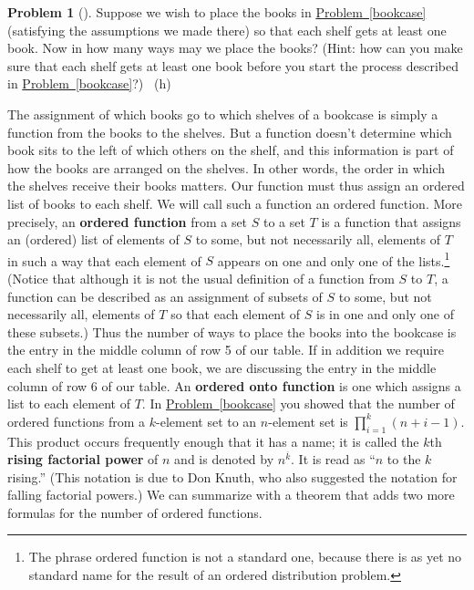 \documentclass[10pt,]{book}
\newcommand{\terminology}[1]{\textbf{#1}}
\theoremstyle{plain}
\theoremstyle{definition}
\newtheorem{activity}[project]{Problem}
\theoremstyle{definition}
\numberwithin{equation}{chapter}
\begin{document}
\begin{activity}[]\marginsymbol[-1em]{} \label{bookcaseeveryshelf}
\hypertarget{p-750}{}%
Suppose we wish to place the books in \hyperref[bookcase]{Problem~\ref{bookcase}} (satisfying the assumptions we made there) so that each shelf gets at least one book. Now in how many ways may we place the books? (Hint: how can you make sure that each shelf gets at least one book before you start the process described in \hyperref[bookcase]{Problem~\ref{bookcase}}?)%
~{\tiny (h)}\end{activity}
\hypertarget{p-753}{}%
The assignment of which books go to which shelves of a bookcase is simply a function from the books to the shelves. But a function doesn't determine which book sits to the left of which others on the shelf, and this information is part of how the books are arranged on the shelves. In other words, the order in which the shelves receive their books matters.  Our function must thus assign an ordered list of books to each shelf. We will call such a function an ordered function. More precisely, an \terminology{ordered function} from a set \(S\) to a set \(T\) is a function that assigns an (ordered) list of elements of \(S\) to some, but not necessarily all, elements of \(T\) in such a way that each element of \(S\) appears on one and only one of the lists.\footnote{The phrase ordered function is not a standard one, because there is as yet no standard name for the result of an ordered distribution problem.\label{fn-6}} (Notice that although it is not the usual definition of a function from \(S\) to \(T\), a function can be described as an assignment of subsets of \(S\) to some, but not necessarily all, elements of \(T\) so that each element of \(S\) is in one and only one of these subsets.) Thus the number of ways to place the books into the bookcase is the entry in the middle column of row 5 of our table. If in addition we require each shelf to get at least one book, we are discussing the entry in the middle column of row 6 of our table. An \terminology{ordered onto function} is one which assigns a list to each element of \(T\). In \hyperref[bookcase]{Problem~\ref{bookcase}} you showed that the number of ordered functions from a \(k\)-element set to an \(n\)-element set is \(\displaystyle \prod_{i=1}^k (n+i-1)\). This product occurs frequently enough that it has a name; it is called the \(k\)\/th \terminology{rising factorial power} of \(n\) and is denoted by \(n^{\overline{k}}\).  It is read as ``\(n\) to the \(k\) rising.'' (This notation is due to Don Knuth, who also suggested the notation for falling factorial powers.) We can summarize with a theorem that adds two more formulas for the number of ordered functions.%
\end{document}
